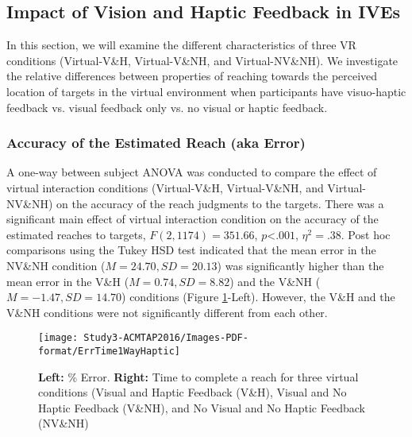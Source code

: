 \subsection{Impact of Vision and Haptic Feedback in IVEs} \label{Oneway}
In this section, we will examine the different characteristics of three VR conditions (Virtual-V\&H, Virtual-V\&NH, and Virtual-NV\&NH). We investigate the relative differences between properties of reaching towards the perceived location of targets in the virtual environment when participants have visuo-haptic feedback vs. visual feedback only vs. no visual or haptic feedback.



\subsubsection{Accuracy of the Estimated Reach (aka Error)} \label{accuracy1way}
A one-way between subject ANOVA was conducted to compare the effect of virtual interaction conditions (Virtual-V\&H, Virtual-V\&NH, and Virtual-NV\&NH) on the accuracy of the reach judgments to the targets. There was a significant main effect of virtual interaction condition on the accuracy of the estimated reaches to targets, $F(2,1174)=351.66$, $p$\textless$.001$, $\eta^{2}=.38$. Post hoc comparisons using the Tukey HSD test indicated that the mean error in the NV\&NH condition ($M=24.70, SD=20.13$) was significantly higher than the mean error in the V\&H ($M=0.74, SD=8.82$) and the V\&NH ($M=-1.47, SD=14.70$) conditions (Figure \ref{fig:ErrTime}-Left). However, the V\&H and the V\&NH conditions were not significantly different from each other. 

\begin{figure}
	\centering
	\texttt{[image: Study3-ACMTAP2016/Images-PDF-format/ErrTime1WayHaptic]}
	\caption{\textbf{Left:} \% Error. \textbf{Right:} Time to complete a reach for three virtual conditions (Visual and Haptic Feedback (V\&H), Visual and No Haptic Feedback (V\&NH), and No Visual and No Haptic Feedback (NV\&NH)}
	\label{fig:ErrTime}
\end{figure} 

